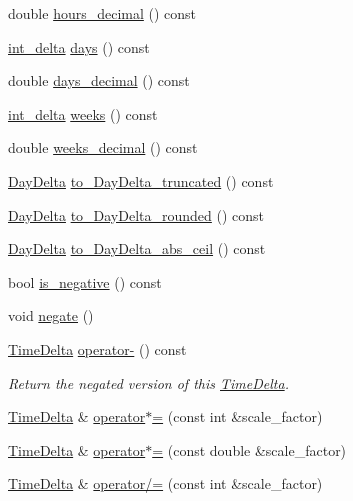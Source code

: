 \begin{DoxyCompactItemize}
double \hyperlink{structTimeDelta_aaae58342e9d06c7c78e9b5dea5cafe02}{hours\-\_\-decimal} () const 
\item 
\hyperlink{types_8h_a8a67cf99971c5cfeeaa2380ba84a4c92}{int\-\_\-delta} \hyperlink{structTimeDelta_abad8a94a6c022af1a1871e452eca47ea}{days} () const 
\item 
double \hyperlink{structTimeDelta_aa73d3724b83ed4badb44b714d86124a2}{days\-\_\-decimal} () const 
\item 
\hyperlink{types_8h_a8a67cf99971c5cfeeaa2380ba84a4c92}{int\-\_\-delta} \hyperlink{structTimeDelta_a4e583a79abea664691df4680f4fd467d}{weeks} () const 
\item 
double \hyperlink{structTimeDelta_a11ca76e0cb990c9011a0ed91cda9ff8e}{weeks\-\_\-decimal} () const 
\item 
\hyperlink{structDayDelta}{\-Day\-Delta} \hyperlink{structTimeDelta_a9ec83cf81fc5e809bfdad62b084c9456}{to\-\_\-\-Day\-Delta\-\_\-truncated} () const 
\item 
\hyperlink{structDayDelta}{\-Day\-Delta} \hyperlink{structTimeDelta_ad4f0f7a7eb10b5c59e54faff404453e4}{to\-\_\-\-Day\-Delta\-\_\-rounded} () const 
\item 
\hyperlink{structDayDelta}{\-Day\-Delta} \hyperlink{structTimeDelta_a7febe32ac5264cc90c672bd65e316187}{to\-\_\-\-Day\-Delta\-\_\-abs\-\_\-ceil} () const 
\item 
bool \hyperlink{structTimeDelta_acc2faf0e9a1563c84fb68cad42521c54}{is\-\_\-negative} () const 
\item 
void \hyperlink{structTimeDelta_a858c8d0eae6070a24ba7fd3e18a3cf3f}{negate} ()
\item 
\hyperlink{structTimeDelta}{\-Time\-Delta} \hyperlink{structTimeDelta_a660df6f5ba7291bef24d5a05639563b6}{operator-\/} () const 
\begin{DoxyCompactList}\small\item\em \-Return the negated version of this \hyperlink{structTimeDelta}{\-Time\-Delta}. \end{DoxyCompactList}\item 
\hyperlink{structTimeDelta}{\-Time\-Delta} \& \hyperlink{structTimeDelta_aa1417029a51a1e2e7cf20445ad6cfa01}{operator$\ast$=} (const int \&scale\-\_\-factor)
\item 
\hyperlink{structTimeDelta}{\-Time\-Delta} \& \hyperlink{structTimeDelta_a8301b98264ca9539a160a756e4014559}{operator$\ast$=} (const double \&scale\-\_\-factor)
\item 
\hyperlink{structTimeDelta}{\-Time\-Delta} \& \hyperlink{structTimeDelta_ac3180211824572ea2f198ca1ad6887c9}{operator/=} (const int \&scale\-\_\-factor)

\end{DoxyCompactItemize}
